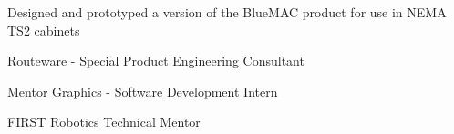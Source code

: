 \documentclass[letterpaper]{deedy-resume} %
\begin{document}
\begin{minipage}[t]{0.66\textwidth}
\begin{tightitemize}
\item Designed and prototyped a version of the BlueMAC product for use in NEMA TS2 cabinets
\end{tightitemize}

\begin{tightitemize}
\item Routeware - Special Product Engineering Consultant
\item Mentor Graphics - Software Development Intern
\item FIRST Robotics Technical Mentor

\end{tightitemize}

\end{minipage} %








\end{document}
